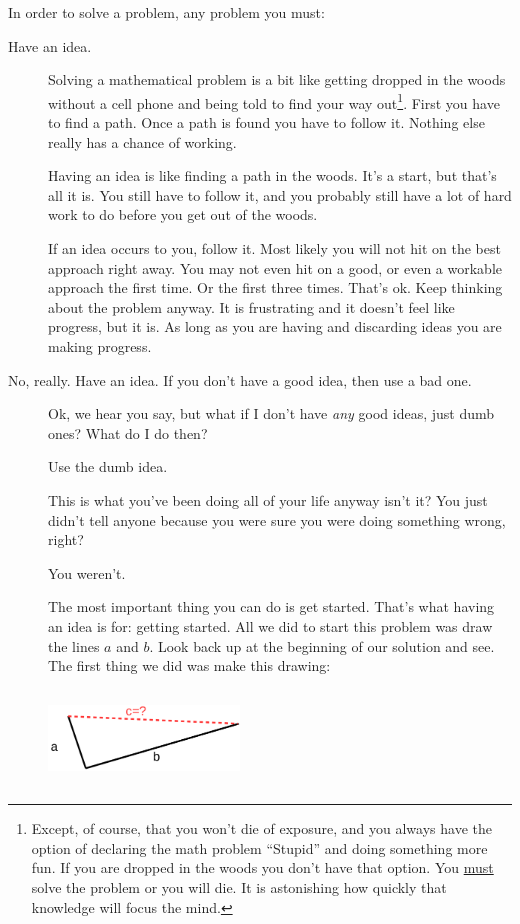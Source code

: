 In order to solve a problem, any problem you must:
\begin{description}
\item[Have an idea.]     Solving a mathematical problem is a bit like getting dropped in
    the woods without a cell phone and being told to find your way
    out\footnote{Except, of course, that you won't die of exposure,
      and you always have the option of declaring the math problem
      ``Stupid'' and doing something more fun. If you are dropped in
      the woods you don't have that option. You \underline{must} solve
      the problem or you will die. It is astonishing how quickly that
      knowledge will focus the mind.}. First you have to find a
    path. Once a path is found you have to follow it. Nothing else
    really has a chance of working. 

    Having an idea is like finding a path in the woods. It's a start,
    but that's all it is. You still have to  follow it, and you
    probably still have a lot of hard work to do before you get out of
    the woods. 

    If an idea occurs to you, follow it. Most likely you will not hit
    on the best approach right away. You may not even hit on a good,
    or even a workable approach the first time. Or the first three
    times. That's ok. Keep thinking about the problem anyway. It is
    frustrating and it doesn't feel like progress, but it is. As long
    as you are having and discarding ideas you are making progress.
  \item[No, really. Have an idea. If you don't have a good idea, then
    use a bad one.] 

    Ok, we hear you say, but what if I don't have \emph{any} good
    ideas, just dumb ones? What do I do then?

    Use the dumb idea. 

    This is what you've been doing all of your life anyway isn't it?
    You just didn't tell anyone because you were sure you were doing
    something wrong, right? 

    You weren't. 

    The most important thing you can do is get started. That's what
    having an idea is for: getting started. All we did to start
    this     problem was draw the lines $a$ and $b.$ Look back up at
    the beginning of our solution and see. The first thing we did was
    make this drawing:\\
      \centerline{\includegraphics*[height=1in,width=2in]{Figures/Advice1}}


\end{description}

